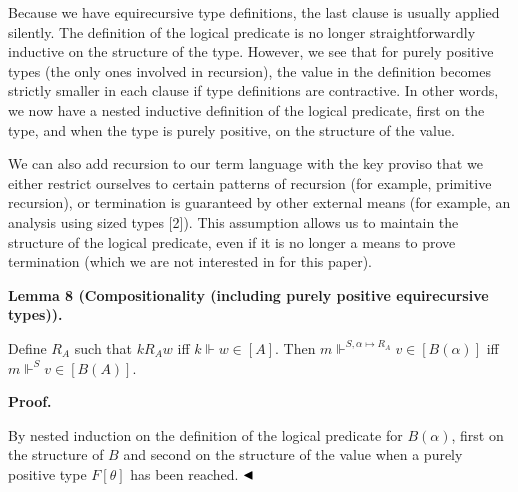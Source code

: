  
 
Because we have equirecursive type definitions, the last clause is usually applied silently. The definition of the logical predicate is no longer straightforwardly inductive on the structure of the type. However, we see that for purely positive types (the only ones involved in recursion), the value in the definition becomes strictly smaller in each clause if type definitions are contractive. In other words, we now have a nested inductive definition of the logical predicate, first on the type, and when the type is purely positive, on the structure of the value.\par
 
 
 
We can also add recursion to our term language with the key proviso that we either restrict ourselves to certain patterns of recursion (for example, primitive recursion), or termination is guaranteed by other external means (for example, an analysis using sized types [2]). This assumption allows us to maintain the structure of the logical predicate, even if it is no longer a means to prove termination (which we are not interested in for this paper).\par
 
 
 
\par\medskip\noindent\textbf{Lemma 8 (Compositionality (including purely positive equirecursive types)).}\par
 
 
Define $R_{A}$ such that $k\mathrel{R_{A}}w$ iff $k\Vdash w\in[A]$. Then $m\Vdash^{S,\alpha\mapsto R_{A}}v\in[B(\alpha)]$ iff $m\Vdash^{S}v\in[B(A)]$.\par
 
 
 
 
\par\medskip\noindent\textbf{Proof.}\par
 
 
By nested induction on the definition of the logical predicate for $B(\alpha)$, first on the structure of $B$ and second on the structure of the value when a purely positive type $F[\theta]$ has been reached. $\hfill\blacktriangleleft$\par
 
